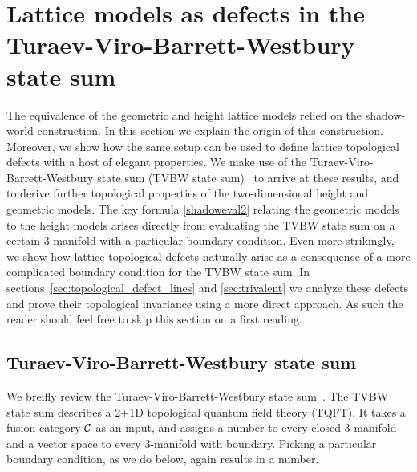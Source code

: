 
\section{Lattice models as defects in the Turaev-Viro-Barrett-Westbury state sum}
\label{modules}


 
 
The equivalence of the geometric and height lattice models relied on the shadow-world construction.
In this section we explain the origin of this construction. Moreover, we show how the same setup can be used to 
define lattice topological defects with a host of elegant properties. We make use of the Turaev-Viro-Barrett-Westbury state sum (TVBW state sum)~\cite{TuraevViro1992,Barrett1996} to arrive at these results, and to 
derive further topological properties of the two-dimensional height and geometric models.
The key formula \eqref{shadoweval2} relating the geometric models to the height models arises directly from evaluating the TVBW state sum on a certain 3-manifold with a particular boundary condition. Even more strikingly, we show how lattice topological defects naturally arise as a consequence of a more complicated boundary condition for the TVBW state sum. In sections~\ref{sec:topological_defect_lines} and \ref{sec:trivalent} we analyze these defects and prove their topological invariance using a more direct approach.  As such the reader should feel free to skip this section on a first reading.


\subsection{Turaev-Viro-Barrett-Westbury state sum}
\label{TVBW state sumwBdry}
We breifly review the Turaev-Viro-Barrett-Westbury state sum~\cite{TuraevViro1992,Barrett1996}.
The TVBW state sum describes a 2+1D topological quantum field theory (TQFT). 
It takes a fusion category $\mathcal{C}$ as an input, 
and assigns a number to every closed 3-manifold and a vector space to every 3-manifold with boundary. 
Picking a particular boundary condition, as we do below, again results in a number. 

